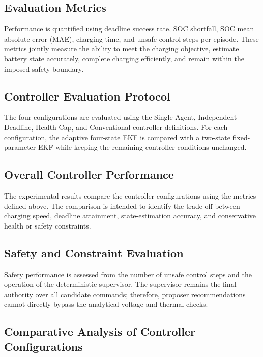 \subsection{Evaluation Metrics}

Performance is quantified using deadline success rate, SOC shortfall, SOC mean absolute error (MAE), charging time, and unsafe control steps per episode. These metrics jointly measure the ability to meet the charging objective, estimate battery state accurately, complete charging efficiently, and remain within the imposed safety boundary.

\subsection{Controller Evaluation Protocol}

The four configurations are evaluated using the Single-Agent, Independent-Deadline, Health-Cap, and Conventional controller definitions. For each configuration, the adaptive four-state EKF is compared with a two-state fixed-parameter EKF while keeping the remaining controller conditions unchanged.

\subsection{Overall Controller Performance}

The experimental results compare the controller configurations using the metrics defined above. The comparison is intended to identify the trade-off between charging speed, deadline attainment, state-estimation accuracy, and conservative health or safety constraints.

\subsection{Safety and Constraint Evaluation}

Safety performance is assessed from the number of unsafe control steps and the operation of the deterministic supervisor. The supervisor remains the final authority over all candidate commands; therefore, proposer recommendations cannot directly bypass the analytical voltage and thermal checks.

\subsection{Comparative Analysis of Controller Configurations}

